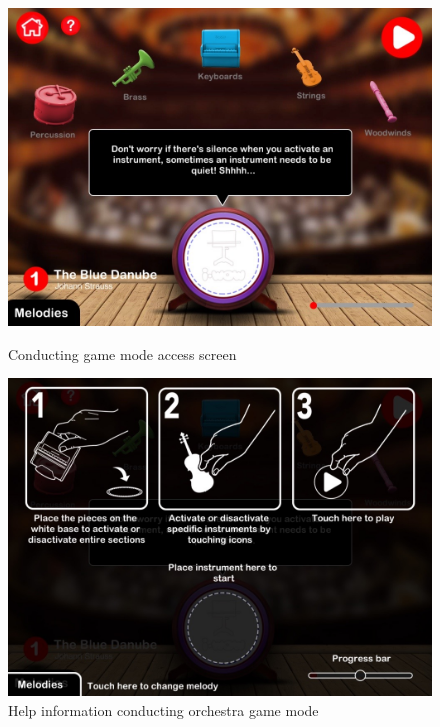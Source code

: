 \begin{figure}[ht!]
  \centering
  \includegraphics[width=350pt]{graphics/use-case/conducting_home_screen.jpg}
  \vspace{0.05cm}
  \caption{Conducting game mode access screen}
  \label{fig:conducting_home_screen}
  \vspace{0.6cm}

  \includegraphics[width=350pt]{graphics/use-case/help_conducting_screen.jpg}
  \vspace{0.05cm}
  \caption{Help information conducting orchestra game mode}
  \label{fig:help_conducting_screen}
\end{figure}

